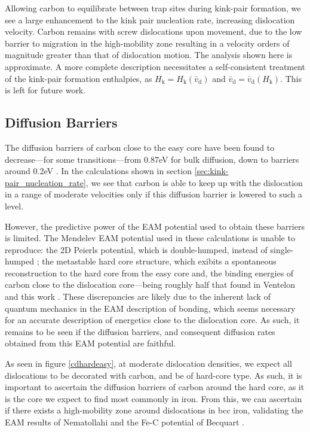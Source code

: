 \documentclass[a4paper,12pt,oneside,print,numbered,index,PageStyleIII]{PhDThesisPSnPDF}
\begin{document}
\begin{enumerate}
Allowing carbon to equilibrate between trap sites during kink-pair formation, we see a
large enhancement to the kink pair nucleation rate, increasing dislocation
velocity. Carbon remains with screw dislocations upon movement, due to the low barrier
to migration in the high-mobility zone resulting in a velocity orders of magnitude
greater than that of dislocation motion. The analysis shown here is approximate. A
more complete description necessitates a self-consistent treatment of the kink-pair
formation enthalpies, as \(H_{\text{k}} = H_{\text{k}}(\bar{v}_{\text{d}})\) and
\(\bar{v}_{\text{d}} = \bar{v}_{\text{d}}(H_{\text{k}})\). This is left for future work.
\end{enumerate}




\subsection{Diffusion Barriers}
\label{sec:orgbd62493}

The diffusion barriers of carbon close to the easy core have been found to decrease---for some
transitions---from 0.87eV for bulk diffusion, down to barriers around 0.2eV
\cite{Nematollahi2016}. In the calculations shown in section \ref{sec:kink-pair_nucleation_rate}, we
see that carbon is able to keep up with the dislocation in a range of moderate velocities only if this
diffusion barrier is lowered to such a level.

However, the predictive power of the EAM potential used to obtain these barriers is limited. The
Mendelev EAM potential used in these calculations is unable to reproduce: the 2D Peierls
potential, which is double-humped, instead of single-humped \cite{Mendelev2003}; the metastable
hard core structure, which exibits a spontaneous reconstruction to the hard core from the easy core and, the binding energies of
carbon close to the dislocation core---being roughly half that found in Ventelon and this work
\cite{Becquart2007,Ventelon2015}. These discrepancies are likely due to the inherent lack of
quantum mechanics in the EAM description of bonding, which seems necessary for an accurate
description of energetics close to the dislocation core. As such, it remains to be seen if the
diffusion barriers, and consequent diffusion rates obtained from this EAM potential are faithful.

As seen in figure \ref{cdhardeasy}, at moderate dislocation densities, we expect all dislocations
to be decorated with carbon, and be of hard-core type. As such, it is important to ascertain the
diffusion barriers of carbon around the hard core, as it is the core we expect to find most
commonly in iron. From this, we can ascertain if there exists a high-mobility zone around
dislocations in bcc iron, validating the EAM results of Nematollahi and the Fe-C potential of Becquart \cite{Nematollahi2016,Becquart2007}.
\end{document}
